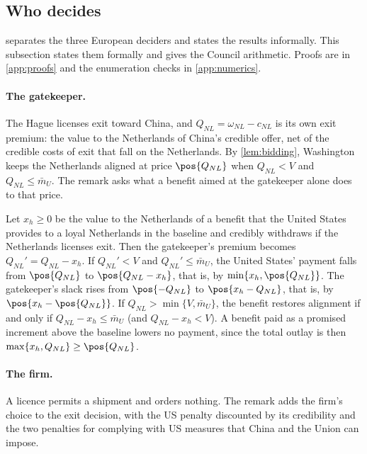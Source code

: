 \subsection{Who decides}\label{app:decide}

 separates the three European deciders and states the results informally. This subsection states them formally and gives the Council arithmetic. Proofs are in \cref{app:proofs} and the enumeration checks in \cref{app:numerics}.

\paragraph{The gatekeeper.} The Hague licenses exit toward China, and $Q_{NL}=\omega_{NL}-c_{NL}$ is its own exit premium: the value to the Netherlands of China's credible offer, net of the credible costs of exit that fall on the Netherlands. By \cref{lem:bidding}, Washington keeps the Netherlands aligned at price $\pos{Q_{NL}}$ when $Q_{NL}<V$ and $Q_{NL}\le\bar m_U$. The remark asks what a benefit aimed at the gatekeeper alone does to that price.

\begin{remark}[Gatekeeper]\label{rem:gatekeeper}
Let $x_h\ge0$ be the value to the Netherlands of a benefit that the United States provides to a loyal Netherlands in the baseline and credibly withdraws if the Netherlands licenses exit. Then the gatekeeper's premium becomes $Q_{NL}'=Q_{NL}-x_h$. If $Q_{NL}'<V$ and $Q_{NL}'\le\bar m_U$, the United States' payment falls from $\pos{Q_{NL}}$ to $\pos{Q_{NL}-x_h}$, that is, by $\min\{x_h,\pos{Q_{NL}}\}$. The gatekeeper's slack rises from $\pos{-Q_{NL}}$ to $\pos{x_h-Q_{NL}}$, that is, by $\pos{x_h-\pos{Q_{NL}}}$. If $Q_{NL}>\min\{V,\bar m_U\}$, the benefit restores alignment if and only if $Q_{NL}-x_h\le\bar m_U$ (and $Q_{NL}-x_h<V$). A benefit paid as a promised increment above the baseline lowers no payment, since the total outlay is then $\max\{x_h,Q_{NL}\}\ge\pos{Q_{NL}}$.
\end{remark}

\paragraph{The firm.} A licence permits a shipment and orders nothing. The remark adds the firm's choice to the exit decision, with the US penalty discounted by its credibility and the two penalties for complying with US measures that China and the Union can impose.

